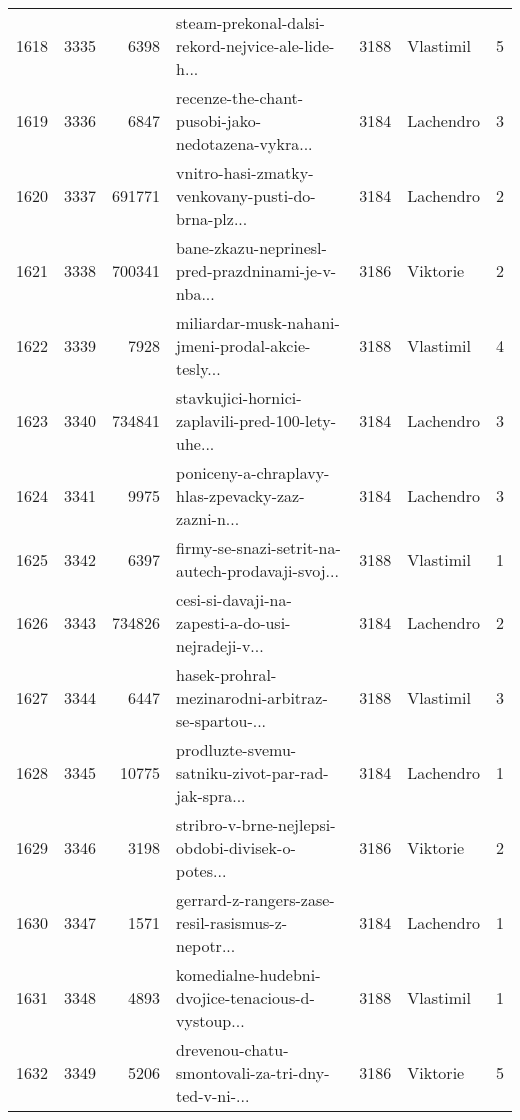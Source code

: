 \begin{tabular}{lrrlrlr}
1618 &       3335 &     6398 &  steam-prekonal-dalsi-rekord-nejvice-ale-lide-h... &     3188 &                    Vlastimil &               5 \\
1619 &       3336 &     6847 &  recenze-the-chant-pusobi-jako-nedotazena-vykra... &     3184 &                    Lachendro &               3 \\
1620 &       3337 &   691771 &  vnitro-hasi-zmatky-venkovany-pusti-do-brna-plz... &     3184 &                    Lachendro &               2 \\
1621 &       3338 &   700341 &  bane-zkazu-neprinesl-pred-prazdninami-je-v-nba... &     3186 &                     Viktorie &               2 \\
1622 &       3339 &     7928 &  miliardar-musk-nahani-jmeni-prodal-akcie-tesly... &     3188 &                    Vlastimil &               4 \\
1623 &       3340 &   734841 &  stavkujici-hornici-zaplavili-pred-100-lety-uhe... &     3184 &                    Lachendro &               3 \\
1624 &       3341 &     9975 &  poniceny-a-chraplavy-hlas-zpevacky-zaz-zazni-n... &     3184 &                    Lachendro &               3 \\
1625 &       3342 &     6397 &  firmy-se-snazi-setrit-na-autech-prodavaji-svoj... &     3188 &                    Vlastimil &               1 \\
1626 &       3343 &   734826 &  cesi-si-davaji-na-zapesti-a-do-usi-nejradeji-v... &     3184 &                    Lachendro &               2 \\
1627 &       3344 &     6447 &  hasek-prohral-mezinarodni-arbitraz-se-spartou-... &     3188 &                    Vlastimil &               3 \\
1628 &       3345 &    10775 &  prodluzte-svemu-satniku-zivot-par-rad-jak-spra... &     3184 &                    Lachendro &               1 \\
1629 &       3346 &     3198 &  stribro-v-brne-nejlepsi-obdobi-divisek-o-potes... &     3186 &                     Viktorie &               2 \\
1630 &       3347 &     1571 &  gerrard-z-rangers-zase-resil-rasismus-z-nepotr... &     3184 &                    Lachendro &               1 \\
1631 &       3348 &     4893 &  komedialne-hudebni-dvojice-tenacious-d-vystoup... &     3188 &                    Vlastimil &               1 \\
1632 &       3349 &     5206 &  drevenou-chatu-smontovali-za-tri-dny-ted-v-ni-... &     3186 &                     Viktorie &               5 \\

\end{tabular}
